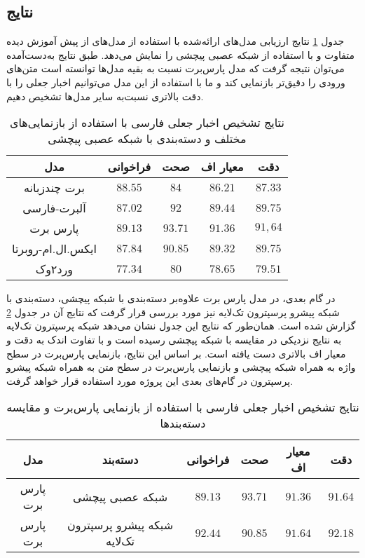 \subsection{نتایج}
جدول \ref{table.text_result_cnn} نتایج ارزیابی مدل‌های ارائه‌شده با استفاده از مدل‌های از پیش آموزش‌ دیده متفاوت و با استفاده از شبکه عصبی پیچشی را نمایش می‌دهد. طبق نتایج به‌دست‌آمده می‌توان نتیجه گرفت که مدل پارس‌برت نسبت‌ به بقیه‌ مدل‌ها توانسته‌ است متن‌های ورودی را دقیق‌تر بازنمایی کند و ما با استفاده از این مدل می‌توانیم اخبار جعلی را با دقت بالاتری نسبت‌به سایر مدل‌ها تشخیص دهیم.

\begin{table}
	\caption{نتایج تشخیص اخبار جعلی فارسی با استفاده از بازنمایی‌های مختلف و دسته‌بندی با شبکه عصبی پیچشی}
	\label{table.text_result_cnn}
	\begin{center}
		\begin{tabular}{|c|c|c|c|c|}
			\hline
مدل & فراخوانی & صحت & معیار اف & دقت \\
			\hline
			\hline
برت چندزبانه & $88.55$ & $84$ & $86.21$ & $87.33$\\
			\hline
آلبرت-فارسی & $87.02$ & $92$ & $89.44$ & $89.75$ \\
			\hline
پارس برت & $89.13$ & $93.71$ & $91.36$ & $91,64$ \\
			\hline
ایکس.ال.ام-روبرتا & $87.84$ & $90.85$ & $89.32$ & $89.75$ \\
			\hline
ورد۲وک & $77.34$ & $80$ & $78.65$ & $79.51$ \\
			\hline
		\end{tabular}
	\end{center}
\end{table}

در گام بعدی، در مدل پارس برت علاوه‌بر دسته‌بندی با شبکه پیچشی، دسته‌بندی با شبکه پیشرو پرسپترون تک‌لایه نیز مورد بررسی قرار گرفت که نتایج آن در جدول \ref{table.text_result_slp} گزارش شده‌ است. همان‌طور که نتایج این جدول نشان می‌دهد شبکه پرسپترون تک‌لایه به نتایج نزدیکی در مقایسه با شبکه پیچشی رسیده‌ است و با تفاوت اندک به دقت و معیار اف بالاتری دست یافته ‌است. بر اساس این نتایج، بازنمایی پارس‌برت در سطح واژه به‌ همراه شبکه پیچشی و بازنمایی پارس‌برت در سطح متن به همراه شبکه پیشرو پرسپترون در گام‌های بعدی این پروژه مورد استفاده قرار خواهد گرفت.

\begin{table}
	\caption{نتایج تشخیص اخبار جعلی فارسی با استفاده از بازنمایی پارس‌برت و مقایسه دسته‌بندها}
	\label{table.text_result_slp}
	\begin{center}
		\begin{tabular}{|c|c|c|c|c|c|}
			\hline
مدل & دسته‌بند & فراخوانی & صحت & معیار اف & دقت \\
			\hline
			\hline
پارس برت & شبکه عصبی پیچشی  & $89.13$ & $93.71$ & $91.36$ & $91.64$ \\
			\hline
پارس برت & شبکه پیشرو پرسپترون تک‌لایه & $92.44$ & $90.85$ & $91.64$ & $92.18$ \\
			\hline
		\end{tabular}
	\end{center}
\end{table}

